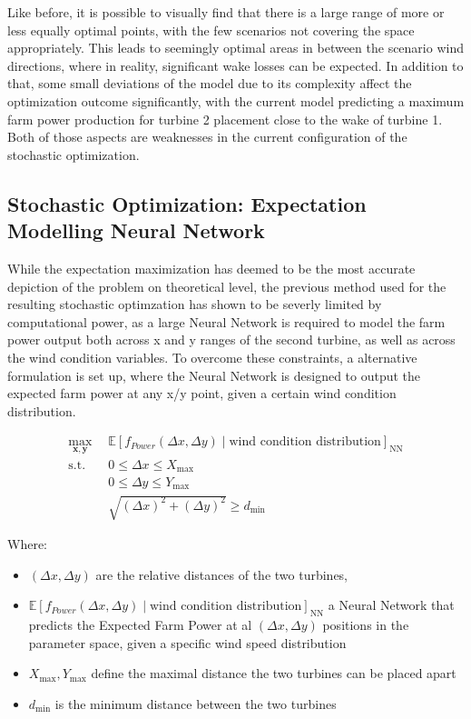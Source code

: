 \documentclass[preprint,12pt]{elsarticle}
\begin{document}
Like before, it is possible to visually find that there is a large range of more or less equally optimal points, with the few scenarios not covering the space appropriately. This leads to seemingly optimal areas in between the scenario wind directions, where in reality, significant wake losses can be expected. In addition to that, some small deviations of the model due to its complexity affect the optimization outcome significantly, with the current model predicting a maximum farm power production for turbine 2 placement close to the wake of turbine 1. Both of those aspects are weaknesses in the current configuration of the stochastic optimization.

\subsection{Stochastic Optimization:  Expectation Modelling Neural Network}

While the expectation maximization has deemed to be the most accurate depiction of the problem on theoretical level, the previous method used for the resulting stochastic optimzation has shown to be severly limited by computational power, as a large Neural Network is required to model the farm power output both across x and y ranges of the second turbine, as well as across the wind condition variables. 
To overcome these constraints, a alternative formulation is set up, where the Neural Network is designed to output the expected farm power at any x/y point, given a certain wind condition distribution. 



\begin{align}
	\max_{\mathbf{x}, \mathbf{y}} &  \mathbb{E}[f_{Power}(\Delta x, \Delta y) \mid \text{wind condition distribution}]_\text{NN} \\
	\text{s.t.} \quad 
	&  0  \leq \Delta x \leq X_{\max} \\
	&  0  \leq \Delta y \leq Y_{\max} \\
	& \sqrt{(\Delta x)^2 + (\Delta y)^2} \geq d_{\min}
\end{align}

Where:
\begin{itemize}
	\item \( (\Delta x, \Delta y) \) are the relative distances of the two turbines,
	\item \( \mathbb{E}[f_{Power}(\Delta x, \Delta y) \mid \text{wind condition distribution}]_\text{NN}\) a Neural Network that predicts the Expected Farm Power at al \( (\Delta x, \Delta y) \) positions in the parameter space, given a specific wind speed distribution 
	\item \(  X_{\max}, Y_{\max} \) define the maximal distance the two turbines can be placed apart
	\item \( d_{\min} \) is the minimum distance between the two turbines
\end{itemize}
\end{document}
